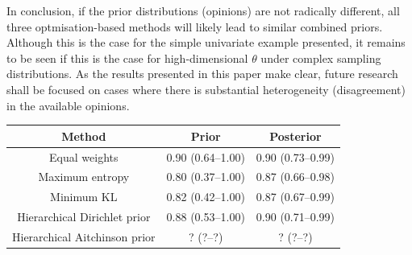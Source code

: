 \documentclass[a4paper, notitlepage, 10pt]{article}
\begin{document}
In conclusion, if the prior distributions (opinions) are not radically different, all three optmisation-based methods will likely lead to similar combined priors.
Although this is the case for the simple univariate example presented, it remains to be seen if this is the case for high-dimensional $\theta$ under complex sampling distributions.
As the results presented in this paper make clear, future research shall be focused on cases where there is substantial heterogeneity (disagreement) in the available opinions.

\begin{table}[ht]
\centering
\begin{tabular}{ccc}
 \hline
Method & Prior & Posterior  \\ 
 \hline
 Equal weights & 0.90 (0.64--1.00) & 0.90 (0.73--0.99) \\ 
 Maximum entropy & 0.80 (0.37--1.00) & 0.87 (0.66--0.98) \\ 
 Minimum KL  & 0.82 (0.42--1.00) & 0.87 (0.67--0.99) \\ 
 Hierarchical Dirichlet prior & 0.88 (0.53--1.00) & 0.90 (0.71--0.99) \\ 
 Hierarchical Aitchinson prior & ? (?--?) & ? (?--?) \\ 
  \hline
\end{tabular}
\label{tab:prior_posteriorsBeta}
\end{table}





\end{document}
